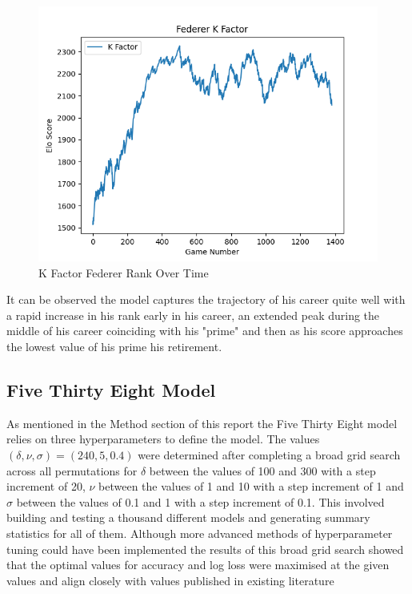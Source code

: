 \documentclass[12pt,a4paper]{article}
\begin{document}
\begin{figure}[H]
  \centering
  \includegraphics[scale=0.8]{images/federer_k_factor.png}
  \caption{K Factor Federer Rank Over Time}
  \label{fig:federer-kfactor}
\end{figure}

It can be observed the model captures the trajectory of his career quite well with a rapid increase
in his rank early in his career, an extended peak
during the middle of his career coinciding with his "prime" and then as his score approaches the lowest
value of his prime his retirement.

\subsection{Five Thirty Eight Model}
As mentioned in the Method section of this report the Five Thirty Eight model relies on
three hyperparameters to define the model. The values $(\delta,\nu,\sigma) = (240,5,0.4)$
were determined after completing a broad grid search across all permutations for $\delta$
between the values of 100 and 300 with a step increment of 20, $\nu$ between the values of
1 and 10 with a step increment of 1 and $\sigma$ between the values of 0.1 and 1 with a
step increment of 0.1. This involved building and testing a thousand different models
and generating summary statistics for all of them. Although more advanced methods of
hyperparameter tuning could have been implemented the results of this broad grid search
showed that the optimal values for accuracy and log loss were maximised at the given values
and align closely with values published in existing literature \cite{kovalchik_searching_2016}
\end{document}
